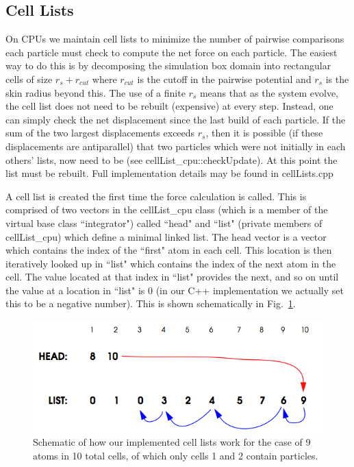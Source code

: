 \documentclass[12pt]{article}
\begin{document}
\subsection{Cell Lists}
On CPUs we maintain cell lists to minimize the number of pairwise comparisons each particle must check to compute the net force on each particle.  The easiest way to do this is by decomposing the simulation box domain into rectangular cells of size $r_s + r_{cut}$ where $r_{cut}$ is the cutoff in the pairwise potential and $r_s$ is the skin radius beyond this.  The use of a finite $r_s$ means that as the system evolve, the cell list does not need to be rebuilt (expensive) at every step.  Instead, one can simply check the net displacement since the last build of each particle.  If the sum of the two largest displacements exceeds $r_s$, then it is possible (if these displacements are antiparallel) that two particles which were not initially in each others' lists, now need to be (see cellList\_cpu::checkUpdate).  At this point the list must be rebuilt.  Full implementation details may be found in cellLists.cpp

A cell list is created the first time the force calculation is called.  This is comprised of two vectors in the cellList\_cpu class (which is a member of the virtual base class ``integrator") called ``head" and ``list" (private members of cellList\_cpu) which define a minimal linked list.
The head vector is a vector which contains the index of the ``first" atom in each cell.  This location is then iteratively looked up in ``list" which contains the index of the next atom in the cell.  The value located at that index in ``list"  provides the next, and so on until the value at a location in ``list" is 0 (in our C++ implementation we actually set this to be a negative number).  This is shown schematically in Fig.~\ref{fig:cell}.

\begin{figure}[H]
   	\includegraphics[width=\textwidth]{cell_list.png}
	\caption{Schematic of how our implemented cell lists work for the case of 9 atoms in 10 total cells, of which only cells 1 and 2 contain particles.}
	\label{fig:cell}
\end{figure}
\end{document}

